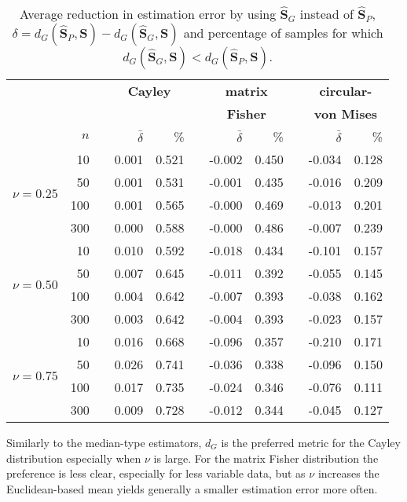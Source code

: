 \begin{table}[h]
\caption{Average reduction in estimation error by using $\widehat{\bm{S}}_{G}$ instead of $\widehat{\bm S}_P$, $\delta=d_G(\widehat{\bm S}_P,\bm S) - d_G(\widehat{\bm S}_{G},\bm S)$ and percentage of samples for which $d_G(\widehat{\bm S}_{G},\bm S) < d_G(\widehat{\bm S}_P,\bm S)$.  \label{tab:percL2}}
\begin{center}
\begin{tabular}{rrcrrcrrcrr}
  \hline
  & &&\multicolumn{2}{c}{\textbf{Cayley}} & &\multicolumn{2}{c}{\textbf{matrix} } &&\multicolumn{2}{c}{\textbf{circular-}}\\
    && &\multicolumn{2}{c}{} & &\multicolumn{2}{c}{\textbf{Fisher}} & &\multicolumn{2}{c}{\textbf{von Mises}}\\ 
\rule[2mm]{0mm}{3mm} 
  &  $n$ && $\bar{\delta}$ & \% & & $\bar{\delta}$ & \% & & $\bar{\delta}$ & \% \\ 
  \hline \hline
\multirow{4}{*}{$\nu=0.25$}
  &   10 &&  0.001 & 0.521 &&  -0.002 & 0.450 && -0.034 & 0.128 \\  
  &   50 && 0.001 & 0.531 &&  -0.001 & 0.435 && -0.016 & 0.209 \\\ 
  &  100 && 0.001 & 0.565 &&  -0.000 & 0.469 && -0.013 & 0.201 \\
  &  300 && 0.000 & 0.588 &&  -0.000 & 0.486 &&  -0.007 & 0.239 \\ \hline
  \multirow{4}{*}{$\nu=0.50$}
   &   10 &&   0.010 & 0.592 &&  -0.018 & 0.434 &&  -0.101 & 0.157 \\ 
   &   50 &&  0.007 & 0.645 &&  -0.011 & 0.392 &&  -0.055 & 0.145 \\ 
   &  100 &&   0.004 & 0.642 &&  -0.007 & 0.393 &&  -0.038 & 0.162 \\ 
   &  300 &&   0.003 & 0.642 &&  -0.004 & 0.393 &&  -0.023 & 0.157 \\ \hline
  \multirow{4}{*}{$\nu=0.75$}
   &   10 &&   0.016 & 0.668 &&  -0.096 & 0.357 &&  -0.210 & 0.171 \\ 
   &   50 &&  0.026 & 0.741 &&  -0.036 & 0.338 &&  -0.096 & 0.150 \\
   &  100 &&  0.017 & 0.735 &&  -0.024 & 0.346 &&  -0.076 & 0.111 \\ 
   &  300 &&  0.009 & 0.728 &&  -0.012 & 0.344 && -0.045 & 0.127 \\ 
   \hline
\end{tabular}
\end{center}
\end{table}

Similarly to the median-type estimators, $d_{G}$ is the preferred metric for the Cayley distribution especially when $\nu$ is large.  For the  matrix Fisher distribution the preference is less clear, especially for less variable data, but as $\nu$ increases the Euclidean-based mean yields generally a smaller estimation error more often. \\
 
